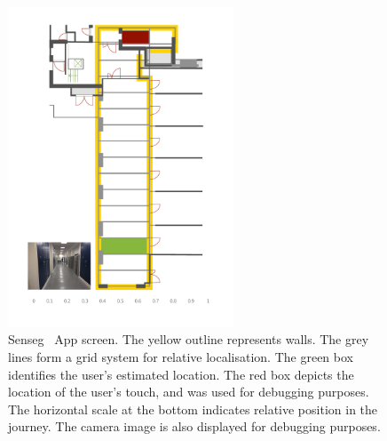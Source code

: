 \begin{figure}[h]
\centering
\includegraphics[width = 0.6\textwidth]{./gfx/Chapter06/screen.pdf}
\caption{Senseg\texttrademark~ App screen. The yellow outline represents walls. The grey lines form a grid system for relative localisation. The green box identifies the user's estimated location. The red box depicts the location of the user's touch, and was used for debugging purposes. The horizontal scale at the bottom indicates relative position in the journey. The camera image is also displayed for debugging purposes.}
\label{fig:sensegscreen}
\end{figure}



